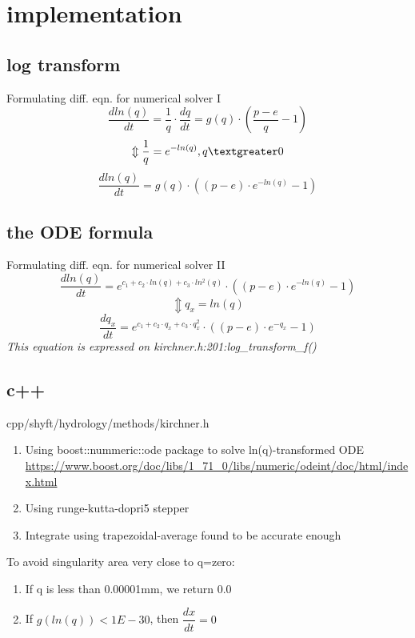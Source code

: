 \documentclass{beamer}
\begin{document}
\section{implementation}
\subsection{log transform}
\begin{frame}{Formulating diff. eqn. for numerical solver I}
	\begin{equation}
	\dfrac{d ln(q)}{dt}=\dfrac{1}{q} \cdot \dfrac{dq}{dt}=g(q) \cdot (\dfrac{p-e}{q}-1)
	\end{equation}
	\begin{equation}
	\Updownarrow  \dfrac{1}{q}= e^{-ln(q)}, q \textgreater 0 \nonumber
	\end{equation}
	\begin{equation}
	\dfrac{d ln(q)}{dt}= g(q) \cdot ((p-e) \cdot e^{-ln(q)}-1)
	\end{equation}
\end{frame}
\subsection{the ODE formula}
\begin{frame}{Formulating diff. eqn. for numerical solver II}
	\begin{equation}
	\dfrac{d ln(q)}{dt}= e^{c_1 + c_2 \cdot ln(q)+ c_3 \cdot ln^{2}(q)} \cdot ((p-e) \cdot e^{-ln(q)}-1)
	\end{equation}
	\begin{equation}
	\Updownarrow  q_{x}=ln(q) \nonumber
	\end{equation}
	\begin{equation}
		\dfrac{d q_{x}}{dt}= e^{c_1+ c_2 \cdot q_{x}+ c_3 \cdot q_{x}^{2}} \cdot ((p-e) \cdot e^{-q_{x}}-1)
	\end{equation}
	\emph{This equation is expressed on kirchner.h:201:log\_transform\_f()}
\end{frame}
\subsection{c++}
\begin{frame}{cpp/shyft/hydrology/methods/kirchner.h}
	\begin{enumerate}
		\item Using boost::nummeric::ode package to solve ln(q)-transformed ODE \url{https://www.boost.org/doc/libs/1_71_0/libs/numeric/odeint/doc/html/index.html}
		\item Using runge-kutta-dopri5 stepper
		\item Integrate using trapezoidal-average found to be accurate enough
	\end{enumerate}
To avoid singularity area very close to q=zero: 
	\begin{enumerate}
		\item If q is less than 0.00001mm, we return 0.0
		\item If $g(ln(q)) < 1E-30$, then $ \dfrac{dx}{dt}=0 $
	\end{enumerate}
\end{frame}
\end{document}
